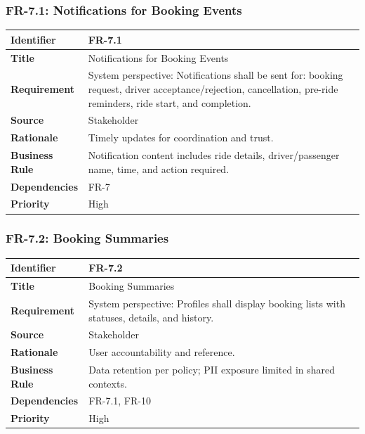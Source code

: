 \subsubsection{FR-7.1: Notifications for Booking Events}

\begin{longtable}{|p{3cm}|p{12cm}|}
\hline
\rowcolor{lightgray!30}
\textbf{Identifier} & FR-7.1 \\
\hline
\textbf{Title} & Notifications for Booking Events \\
\hline
\textbf{Requirement} & System perspective: Notifications shall be sent for: booking request, driver acceptance/rejection, cancellation, pre-ride reminders, ride start, and completion. \\
\hline
\textbf{Source} & Stakeholder \\
\hline
\textbf{Rationale} & Timely updates for coordination and trust. \\
\hline
\textbf{Business Rule} & Notification content includes ride details, driver/passenger name, time, and action required. \\
\hline
\textbf{Dependencies} & FR-7 \\
\hline
\textbf{Priority} & High \\
\hline
\end{longtable}

\subsubsection{FR-7.2: Booking Summaries}

\begin{longtable}{|p{3cm}|p{12cm}|}
\hline
\rowcolor{lightgray!30}
\textbf{Identifier} & FR-7.2 \\
\hline
\textbf{Title} & Booking Summaries \\
\hline
\textbf{Requirement} & System perspective: Profiles shall display booking lists with statuses, details, and history. \\
\hline
\textbf{Source} & Stakeholder \\
\hline
\textbf{Rationale} & User accountability and reference. \\
\hline
\textbf{Business Rule} & Data retention per policy; PII exposure limited in shared contexts. \\
\hline
\textbf{Dependencies} & FR-7.1, FR-10 \\
\hline
\textbf{Priority} & High \\
\hline
\end{longtable}

